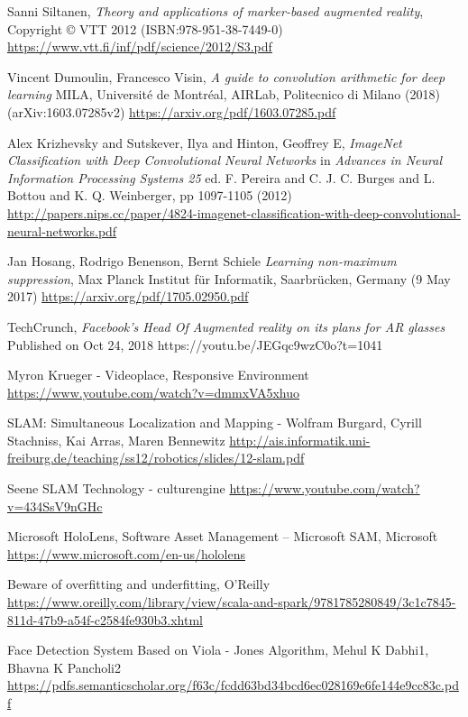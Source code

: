 
\begin{thebibliography}{X}

Sanni Siltanen, \textit{Theory and applications of marker-based augmented reality},
Copyright © VTT 2012 (ISBN:978-951-38-7449-0)
\url{https://www.vtt.fi/inf/pdf/science/2012/S3.pdf}

Vincent Dumoulin, Francesco Visin, \textit{A guide to convolution arithmetic for deep learning}
 MILA, Universit\'e de Montr\'eal,
AIRLab, Politecnico di Milano (2018)
(arXiv:1603.07285v2)
\url{https://arxiv.org/pdf/1603.07285.pdf}


Alex Krizhevsky and Sutskever, Ilya and Hinton, Geoffrey E, \textit{ImageNet Classification with Deep Convolutional Neural Networks} in \textit{Advances in Neural Information Processing Systems 25} ed. F. Pereira and C. J. C. Burges and L. Bottou and K. Q. Weinberger, pp 1097-1105 (2012)
\url{http://papers.nips.cc/paper/4824-imagenet-classification-with-deep-convolutional-neural-networks.pdf}

Jan Hosang, Rodrigo Benenson, Bernt Schiele \textit{Learning non-maximum suppression}, Max Planck Institut für Informatik, Saarbrücken, Germany (9 May 2017)
\url{https://arxiv.org/pdf/1705.02950.pdf}

TechCrunch, \textit{Facebook's Head Of Augmented reality on its plans for AR glasses}
Published on Oct 24, 2018
https://youtu.be/JEGqc9wzC0o?t=1041

Myron Krueger - Videoplace, Responsive Environment
\url{https://www.youtube.com/watch?v=dmmxVA5xhuo}

SLAM: Simultaneous Localization and Mapping - Wolfram Burgard, Cyrill Stachniss, Kai Arras, Maren Bennewitz
\url{http://ais.informatik.uni-freiburg.de/teaching/ss12/robotics/slides/12-slam.pdf}

Seene SLAM Technology - culturengine
\url{https://www.youtube.com/watch?v=434SsV9nGHc}

Microsoft HoloLens, Software Asset Management – Microsoft SAM, Microsoft
\url{https://www.microsoft.com/en-us/hololens}

Beware of overfitting and underfitting, O'Reilly
\url{https://www.oreilly.com/library/view/scala-and-spark/9781785280849/3c1c7845-811d-47b9-a54f-c2584fe930b3.xhtml}

Face Detection System Based on Viola - Jones Algorithm, Mehul K Dabhi1, Bhavna K Pancholi2
\url{https://pdfs.semanticscholar.org/f63c/fcdd63bd34bcd6ec028169e6fe144e9cc83c.pdf}


\end{thebibliography}

